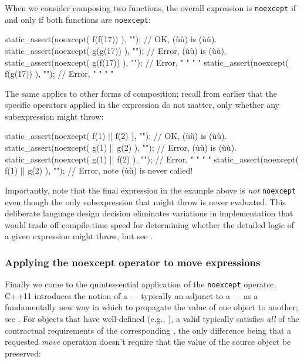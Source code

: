 \noindent When we consider composing two functions, the overall expression is
\lstinline!noexcept! if and only if both functions are \lstinline!noexcept!:

\begin{emcppslisting}
static_assert(noexcept( f(f(17)) ), "");  // OK,    (ù{}ù) is (ù{}ù).
static_assert(noexcept( g(g(17)) ), "");  // Error, (ù{}ù) is (ù{}ù).
static_assert(noexcept( g(f(17)) ), "");  // Error,  "   "      "      "
static_assert(noexcept( f(g(17)) ), "");  // Error,  "   "      "      "
\end{emcppslisting}
    

\noindent The same applies to other forms of composition; recall from earlier that
the specific operators applied in the expression do not matter, only
whether any  subexpression might throw:

\begin{emcppslisting}
static_assert(noexcept( f(1) || f(2) ), "");  // OK,    (ù{}ù) is (ù{}ù).
static_assert(noexcept( g(1) || g(2) ), "");  // Error, (ù{}ù) is (ù{}ù).
static_assert(noexcept( g(1) || f(2) ), "");  // Error,  "   "      "      "
static_assert(noexcept( f(1) || g(2) ), "");  // Error, note (ù{}ù) is never called!
\end{emcppslisting}
    

\noindent Importantly, note that the final expression in the example above is
\emph{not} \lstinline!noexcept! even though the only subexpression that
might throw is never evaluated. This deliberate language design decision
eliminates variations in implementation that would trade off
compile-time speed for determining whether the detailed logic of a given
expression might throw, but see .

\subsubsection[Applying the \lstinline!noexcept! operator to move expressions]{Applying the {\SubsubsecCode noexcept} operator to move expressions}\label{applying-the-noexcept-operator-to-move-expressions}

Finally we come to the quintessential application of the
\lstinline!noexcept! operator. C++11 introduces the notion of a
 --- typically an adjunct to a  --- as a fundamentally new way in which to propagate the
value of one object to another; see . For objects that have well-defined  (e.g., ), a valid  typically satisfies \emph{all} of the contractual
requirements of the corresponding , the only
difference being that a requested \emph{move} operation doesn't require
that the value of the source object be preserved:

